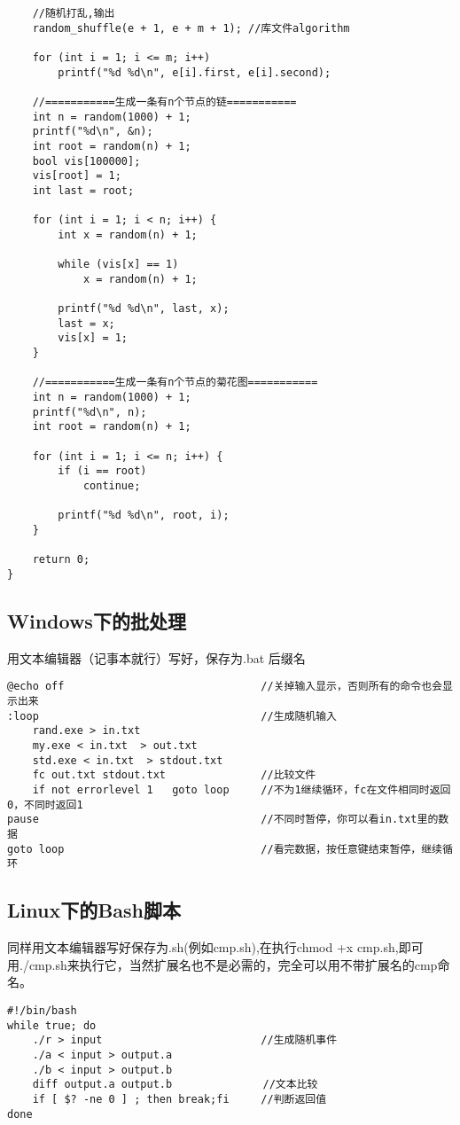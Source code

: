 \begin{verbatim}
    //随机打乱,输出
    random_shuffle(e + 1, e + m + 1); //库文件algorithm

    for (int i = 1; i <= m; i++)
        printf("%d %d\n", e[i].first, e[i].second);

    //===========生成一条有n个节点的链===========
    int n = random(1000) + 1;
    printf("%d\n", &n);
    int root = random(n) + 1;
    bool vis[100000];
    vis[root] = 1;
    int last = root;

    for (int i = 1; i < n; i++) {
        int x = random(n) + 1;

        while (vis[x] == 1)
            x = random(n) + 1;

        printf("%d %d\n", last, x);
        last = x;
        vis[x] = 1;
    }

    //===========生成一条有n个节点的菊花图===========
    int n = random(1000) + 1;
    printf("%d\n", n);
    int root = random(n) + 1;

    for (int i = 1; i <= n; i++) {
        if (i == root)
            continue;

        printf("%d %d\n", root, i);
    }

    return 0;
}
\end{verbatim}

\subsection{Windows下的批处理}

\par \noindent 用文本编辑器（记事本就行）写好，保存为.bat 后缀名
\begin{verbatim}
@echo off                               //关掉输入显示，否则所有的命令也会显示出来
:loop                                   //生成随机输入
    rand.exe > in.txt
    my.exe < in.txt  > out.txt       
    std.exe < in.txt  > stdout.txt
    fc out.txt stdout.txt               //比较文件
    if not errorlevel 1   goto loop     //不为1继续循环，fc在文件相同时返回0，不同时返回1
pause                                   //不同时暂停，你可以看in.txt里的数据
goto loop                               //看完数据，按任意键结束暂停，继续循环
\end{verbatim}

\subsection{Linux下的Bash脚本}

\par \noindent 同样用文本编辑器写好保存为.sh(例如cmp.sh),在执行chmod +x cmp.sh,即可用./cmp.sh来执行它，当然扩展名也不是必需的，完全可以用不带扩展名的cmp命名。
\begin{verbatim}
#!/bin/bash
while true; do
    ./r > input                         //生成随机事件
    ./a < input > output.a
    ./b < input > output.b
    diff output.a output.b　　　　　      //文本比较
    if [ $? -ne 0 ] ; then break;fi     //判断返回值
done
\end{verbatim}


